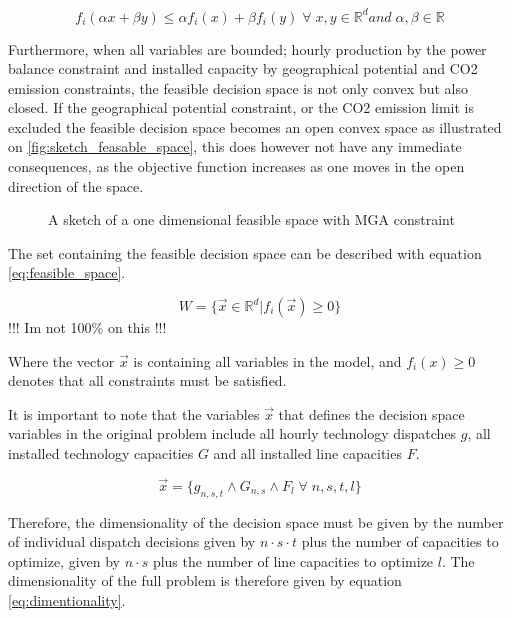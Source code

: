 \begin{equation}\label{eq:convex_requirement}
f_i(\alpha x + \beta y) \leq \alpha f_i(x) + \beta f_i(y) \; \forall \; x, y \in \mathbb{R}^d and  \; \alpha, \beta \in \mathbb{R}
\end{equation}

Furthermore, when all variables are bounded; hourly production by the power balance constraint and installed capacity by geographical potential and CO2 emission constraints, the feasible decision space is not only convex but also closed. If the geographical potential constraint, or the CO2 emission limit is excluded the feasible decision space becomes an open convex space as illustrated on \vref{fig:sketch_feasable_space}, this does however not have any immediate consequences, as the objective function increases as one moves in the open direction of the space. 

\begin{figure}[ht]
	\centering
	\caption{A sketch of a one dimensional feasible space with MGA constraint }
	\label{fig:sketch_feasable_space}
\end{figure}

The set containing the feasible decision space can be described with equation \ref{eq:feasible_space}. 

\begin{equation}\label{eq:feasible_space}
W = \{ \vec{x}\in \mathbb{R}^d | f_i(\vec{x}) \geq 0 \}
\end{equation}
!!! Im not 100\% on this !!! 

Where the vector $\vec{x}$ is containing all variables in the model, and $ f_i(x) \geq 0 $ denotes that all constraints must be satisfied. 

It is important to note that the variables $\vec{x}$ that defines the decision space variables in the original problem include all hourly technology dispatches $g$, all installed technology capacities $G$ and all installed line capacities $F$. 

\begin{equation}
\vec{x} = \{g_{n,s,t} \wedge G_{n,s} \wedge F_l \; \forall \; n,s,t,l \}
\end{equation}


Therefore, the dimensionality of the decision space must be given by the number of individual dispatch decisions given by $n\cdot s \cdot t$ plus the number of capacities to optimize, given by $n\cdot s$ plus the number of line capacities to optimize $l$. The dimensionality of the full problem is therefore given by equation \vref{eq:dimentionality}.

